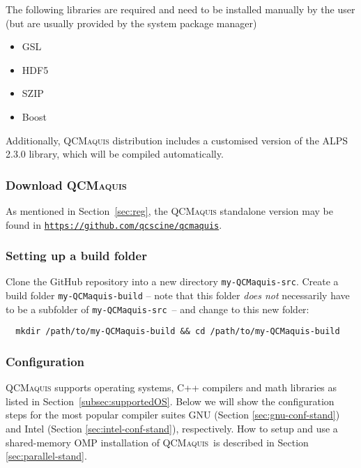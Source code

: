 \documentclass[bibliography=totoc,12pt,a4paper]{scrartcl}
\newcommand{\qcm}{\textsc{QCMaquis}}
\newcommand{\qcmsrc}{\texttt{my-QCMaquis-src}}
\newcommand{\qcmbuild}{\texttt{my-QCMaquis-build}}
\begin{document}
The following libraries are required and need to be installed manually by the user (but are usually provided by the system package manager)

\begin{itemize}
 \item GSL
 \item HDF5
 \item SZIP
 \item Boost
\end{itemize}

Additionally, \qcm{} distribution includes a customised version of the ALPS 2.3.0 library, which will be compiled automatically.

\subsubsection{Download \qcm}
\label{subsubsec:download-stand}

As mentioned in Section~\ref{sec:reg}, the \qcm{} standalone version may be found in \texttt{\url{https://github.com/qcscine/qcmaquis}}.

\subsubsection{Setting up a build folder}

Clone the GitHub repository into a new directory \texttt{\qcmsrc}. Create a build folder \texttt{\qcmbuild} -- note that this folder \emph{does not} necessarily have to be a subfolder of \qcmsrc\ -- and change to this new folder:

\begin{verbatim}
  mkdir /path/to/my-QCMaquis-build && cd /path/to/my-QCMaquis-build
\end{verbatim}

\subsubsection{Configuration}
\label{subsubsec:configure-stand}

\qcm{} supports operating systems, C++ compilers and math libraries as listed in Section~\ref{subsec:supportedOS}. 
Below we will show the configuration steps for the most popular compiler suites GNU (Section \ref{sec:gnu-conf-stand}) and Intel (Section \ref{sec:intel-conf-stand}), respectively.
How to setup and use a shared-memory OMP installation of \qcm\ is described in Section \ref{sec:parallel-stand}.
\end{document}
